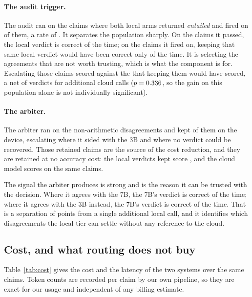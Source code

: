 \documentclass{article}
\begin{document}
\paragraph{The audit trigger.}
The audit ran on the \auditRan{} claims where both local arms returned \emph{entailed} and
fired on \auditFired{} of them, a rate of \auditFireRate{}. It separates the population
sharply. On the claims it passed, the local verdict is correct \auditPassedScore{} of the
time; on the claims it fired on, keeping that same local verdict would have been correct
only \auditLocalWouldScore{} of the time. It is selecting the agreements that are not worth
trusting, which is what the component is for. Escalating those \auditFired{} claims scored
\auditCloudScored{} against the \auditLocalWouldScore{} that keeping them would have scored,
a net of \auditNet{} verdicts for \auditFired{} additional cloud calls
($p = 0.336{}$, so the gain on this population alone is not individually significant).

\paragraph{The arbiter.}
The arbiter ran on the \arbRan{} non-arithmetic disagreements and kept \arbKept{} of them on
the device, escalating \arbEscalated{} where it sided with the 3B and \arbUnreadable{} where
no verdict could be recovered. Those \arbKept{} retained claims are the source of the cost
reduction, and they are retained at no accuracy cost: the local verdicts kept score
\arbKeptScore{}, and the cloud model scores \arbCloudOnSame{} on the same claims.

The signal the arbiter produces is strong and is the reason it can be trusted with the
decision. Where it agrees with the 7B, the 7B's verdict is correct \arbSidedSevenBCorrect{}
of the time; where it agrees with the 3B instead, the 7B's verdict is correct
\arbSidedThreeBCorrect{} of the time. That is a separation of \arbSeparation{} points from a
single additional local call, and it identifies which disagreements the local tier can
settle without any reference to the cloud.

\subsection{Cost, and what routing does not buy}
\label{sec:cost}

Table~\ref{tab:cost} gives the cost and the latency of the two systems over the same
\nTest{} claims. Token counts are recorded per claim by our own pipeline, so they are exact
for our usage and independent of any billing estimate.
\end{document}
